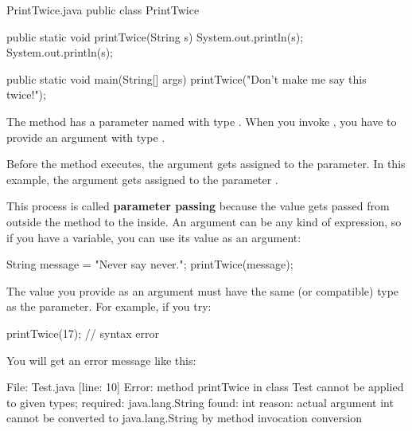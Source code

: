 
\begin{trinket}[295]{PrintTwice.java}
public class PrintTwice {

    public static void printTwice(String s) {
        System.out.println(s);
        System.out.println(s);
    }

    public static void main(String[] args) {
        printTwice("Don't make me say this twice!");
    }
}
\end{trinket}

The  method has a parameter named  with type .
When you invoke , you have to provide an argument with type .


Before the method executes, the argument gets assigned to the parameter.
In this example, the argument  gets assigned to the parameter .


This process is called {\bf parameter passing} because the value gets passed from outside the method to the inside.
An argument can be any kind of expression, so if you have a  variable, you can use its value as an argument:

\begin{code}
String message = "Never say never.";
printTwice(message);
\end{code}

The value you provide as an argument must have the same (or compatible) type as the parameter.
For example, if you try:

\begin{code}
printTwice(17);  // syntax error
\end{code}

You will get an error message like this:

\begin{stdout}
File: Test.java  [line: 10]
Error: method printTwice in class Test cannot be applied
       to given types;
  required: java.lang.String
  found: int
  reason: actual argument int cannot be converted to
          java.lang.String by method invocation conversion
\end{stdout}

